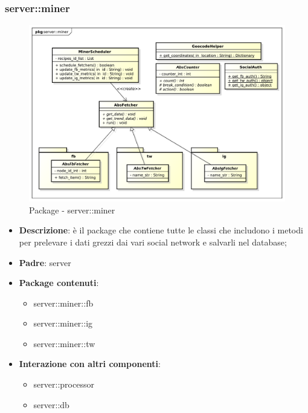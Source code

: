 


\subsubsection{server::miner} %
\label{ssub:bdsm_app_server_miner}
\begin{figure}[htbp]
	\centering
	\centerline{\includegraphics[scale=0.4]{./images/server/miner.pdf}}
	\caption{Package - server::miner}
\end{figure}

\begin{itemize}
  \item \textbf{Descrizione}: è il package che contiene tutte le classi che includono i metodi per prelevare i dati grezzi dai vari social network e salvarli nel database;
  \item \textbf{Padre}: server
  \item \textbf{Package contenuti}:
  	\begin{itemize}
  		\item server::miner::fb
  		\item server::miner::ig
  		\item server::miner::tw
  	\end{itemize}
  \item \textbf{Interazione con altri componenti}:
  	\begin{itemize}
  		\item server::processor
  		\item server::db
  	\end{itemize}
\end{itemize}

